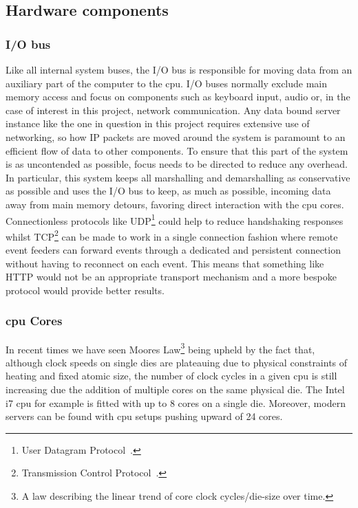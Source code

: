 \documentclass[a4paper,11pt]{scrreprt}
\begin{document}
\subsection{Hardware components}
\subsubsection{I/O bus}
Like all internal system buses, the I/O bus is responsible for moving data from an auxiliary part of the computer to the \acrshort{cpu}. I/O buses normally exclude main memory access and focus on components such as keyboard input, audio or, in the case of interest in this project, network communication. Any data bound server instance like the one in question in this project requires extensive use of networking, so how IP packets are moved around the system is paramount to an efficient flow of data to other components. To ensure that this part of the system is as uncontended as possible, focus needs to be directed to reduce any overhead. In particular, this system keeps all marshalling and demarshalling as conservative as possible and uses the I/O bus to keep, as much as possible, incoming data away from main memory detours, favoring direct interaction with the \acrshort{cpu} cores. Connectionless protocols like UDP\footnote{User Datagram Protocol~\cite{udp-rfc}.} could help to reduce handshaking responses whilst TCP\footnote{Transmission Control Protocol~\cite{tcp-rfc}.} can be made to work in a single connection fashion where remote event feeders can forward events through a dedicated and persistent connection without having to reconnect on each event. This means that something like HTTP would not be an appropriate transport mechanism and a more bespoke protocol would provide better results.
\subsubsection{\acrshort{cpu} Cores}
In recent times we have seen Moores Law\footnote{A law describing the linear trend of core clock cycles/die-size over time.} being upheld by the fact that, although clock speeds on single dies are plateauing due to physical constraints of heating and fixed atomic size, the number of clock cycles in a given \acrshort{cpu} is still increasing due the addition of multiple cores on the same physical die. The Intel i7 \acrshort{cpu} for example is fitted with up to 8 cores on a single die. Moreover, modern servers can be found with \acrshort{cpu} setups pushing upward of 24 cores.
\end{document}
